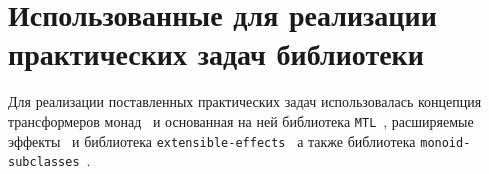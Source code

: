 \section{Использованные для реализации практических задач библиотеки}

Для реализации поставленных практических задач использовалась концепция 
трансформеров монад~\cite{monadTransformers} и основанная на ней библиотека
\lstinline{MTL}~\cite{mtlHackage}, расширяемые эффекты~\cite{extEffects} 
и библиотека \lstinline{extensible-effects}~\cite{extensibleEffectsHackage} а также библиотека
\lstinline{monoid-subclasses}~\cite{monoidSubclassesHackage}.